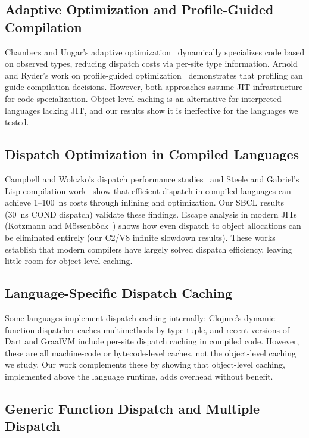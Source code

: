 \documentclass[sigplan,final,acmsmall,review,screen]{acmart}
\begin{document}
\subsection{Adaptive Optimization and Profile-Guided Compilation}

Chambers and Ungar's adaptive optimization~\cite{chambers1989optimizing} dynamically specializes code based on observed types,
reducing dispatch costs via per-site type information. Arnold and Ryder's work on profile-guided optimization~\cite{arnold2005feedback} demonstrates
that profiling can guide compilation decisions. However, both approaches assume JIT infrastructure for code specialization.
Object-level caching is an alternative for interpreted languages lacking JIT, and our results show it is ineffective for the languages we tested.

\subsection{Dispatch Optimization in Compiled Languages}

Campbell and Wolczko's dispatch performance studies~\cite{campbell1992array} and Steele and Gabriel's Lisp compilation work~\cite{steele1990lisp}
show that efficient dispatch in compiled languages can achieve 1--100~ns costs through inlining and optimization. Our SBCL results (30~ns COND dispatch)
validate these findings. Escape analysis in modern JITs (Kotzmann and Mössenböck~\cite{kotzmann2005escape}) shows how even dispatch to object allocations can be eliminated entirely
(our C2/V8 infinite slowdown results). These works establish that modern compilers have largely solved dispatch efficiency,
leaving little room for object-level caching.

\subsection{Language-Specific Dispatch Caching}

Some languages implement dispatch caching internally: Clojure's dynamic function dispatcher caches multimethods by type tuple,
and recent versions of Dart and GraalVM include per-site dispatch caching in compiled code. However, these are all machine-code or
bytecode-level caches, not the object-level caching we study. Our work complements these by showing that object-level caching,
implemented above the language runtime, adds overhead without benefit.

\subsection{Generic Function Dispatch and Multiple Dispatch}
\end{document}
